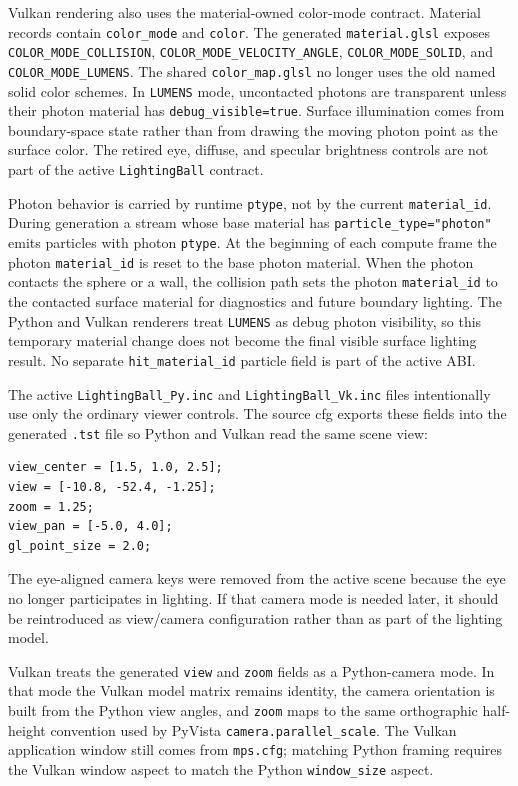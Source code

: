 Vulkan rendering also uses the material-owned color-mode contract.  Material
records contain \texttt{color\_mode} and \texttt{color}.  The generated
\texttt{material.glsl} exposes \texttt{COLOR\_MODE\_COLLISION},
\texttt{COLOR\_MODE\_VELOCITY\_ANGLE}, \texttt{COLOR\_MODE\_SOLID}, and
\texttt{COLOR\_MODE\_LUMENS}.  The shared \texttt{color\_map.glsl} no longer
uses the old named solid color schemes.  In \texttt{LUMENS} mode, uncontacted
photons are transparent unless their photon material has
\texttt{debug\_visible=true}.  Surface illumination comes from boundary-space
state rather than from drawing the moving photon point as the surface color.
The retired eye, diffuse, and specular brightness controls are not part of
the active \texttt{LightingBall} contract.

Photon behavior is carried by runtime \texttt{ptype}, not by the current
\texttt{material\_id}.  During generation a stream whose base material has
\texttt{particle\_type="photon"} emits particles with photon \texttt{ptype}.
At the beginning of each compute frame the photon \texttt{material\_id} is
reset to the base photon material.  When the photon contacts the sphere or a
wall, the collision path sets the photon \texttt{material\_id} to the
contacted surface material for diagnostics and future boundary lighting.
The Python and Vulkan renderers treat \texttt{LUMENS} as debug photon
visibility, so this temporary material change does not become the final
visible surface lighting result.  No separate \texttt{hit\_material\_id}
particle field is part of the active ABI.

The active \texttt{LightingBall\_Py.inc} and
\texttt{LightingBall\_Vk.inc} files intentionally use only the ordinary
viewer controls.  The source cfg exports these fields into the generated
\texttt{.tst} file so Python and Vulkan read the same scene view:
\begin{verbatim}
view_center = [1.5, 1.0, 2.5];
view = [-10.8, -52.4, -1.25];
zoom = 1.25;
view_pan = [-5.0, 4.0];
gl_point_size = 2.0;
\end{verbatim}
The eye-aligned camera keys were removed from the active scene because the
eye no longer participates in lighting.  If that camera mode is needed later,
it should be reintroduced as view/camera configuration rather than as part of
the lighting model.

Vulkan treats the generated \texttt{view} and \texttt{zoom} fields as a
Python-camera mode.  In that mode the Vulkan model matrix remains identity,
the camera orientation is built from the Python view angles, and
\texttt{zoom} maps to the same orthographic half-height convention used by
PyVista \texttt{camera.parallel\_scale}.  The Vulkan application window still
comes from \texttt{mps.cfg}; matching Python framing requires the Vulkan
window aspect to match the Python \texttt{window\_size} aspect.

